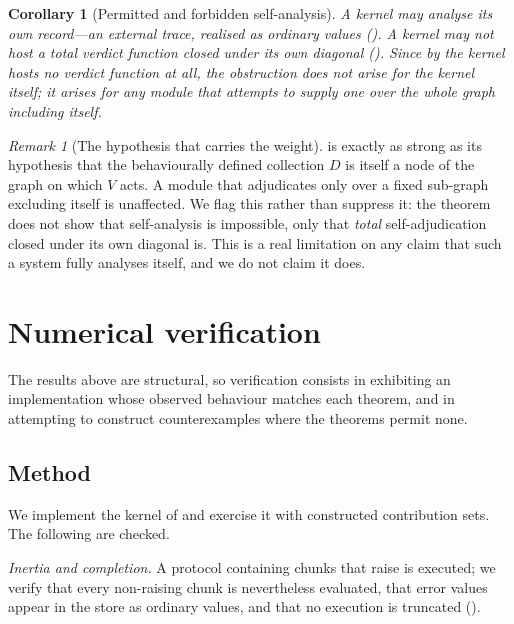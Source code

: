 \documentclass[11pt,a4paper]{article}
\theoremstyle{thmstyle}
\newtheorem{corollary}[theorem]{Corollary}
\theoremstyle{definition}
\theoremstyle{remark}
\newtheorem{remark}[theorem]{Remark}
\begin{document}
\begin{corollary}[Permitted and forbidden self-analysis]
\label{cor:self-limit}
A kernel may analyse its own \emph{record}---an external trace, realised as
ordinary values (). A kernel may not host a total
verdict function closed under its own diagonal
(). Since by  the kernel hosts no
verdict function at all, the obstruction does not arise for the kernel
itself; it arises for any module that attempts to supply one over the whole
graph including itself.
\end{corollary}

\begin{remark}[The hypothesis that carries the weight]
\label{rem:closure-hyp}
 is exactly as strong as its hypothesis that the
behaviourally defined collection $D$ is itself a node of the graph on which
$V$ acts. A module that adjudicates only over a fixed sub-graph excluding
itself is unaffected. We flag this rather than suppress it: the theorem does
not show that self-analysis is impossible, only that \emph{total}
self-adjudication closed under its own diagonal is. This is a real
limitation on any claim that such a system fully analyses itself, and we do
not claim it does.
\end{remark}

\section{Numerical verification}
\label{sec:validation}

The results above are structural, so verification consists in exhibiting an
implementation whose observed behaviour matches each theorem, and in
attempting to construct counterexamples where the theorems permit none.

\subsection{Method}

We implement the kernel of  and exercise it with
constructed contribution sets. The following are checked.

\emph{Inertia and completion.} A protocol containing chunks that raise is
executed; we verify that every non-raising chunk is nevertheless evaluated,
that error values appear in the store as ordinary values, and that no
execution is truncated ().
\end{document}
